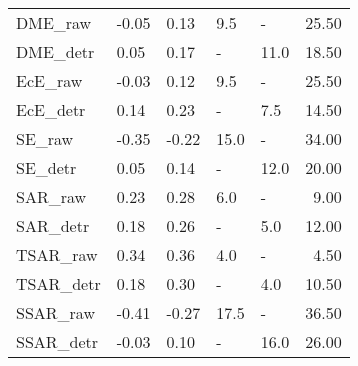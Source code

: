 \begin{tabular}{lllllr}
\midrule
DME\_raw & -0.05 & 0.13 & 9.5 & - & 25.50 \\
DME\_detr & 0.05 & 0.17 & - & 11.0 & 18.50 \\
\midrule
EcE\_raw & -0.03 & 0.12 & 9.5 & - & 25.50 \\
EcE\_detr & 0.14 & 0.23 & - & 7.5 & 14.50 \\
\midrule
SE\_raw & -0.35 & -0.22 & 15.0 & - & 34.00 \\
SE\_detr & 0.05 & 0.14 & - & 12.0 & 20.00 \\
\midrule
SAR\_raw & 0.23 & 0.28 & 6.0 & - & 9.00 \\
SAR\_detr & 0.18 & 0.26 & - & 5.0 & 12.00 \\
\midrule
TSAR\_raw & 0.34 & 0.36 & 4.0 & - & 4.50 \\
TSAR\_detr & 0.18 & 0.30 & - & 4.0 & 10.50 \\
\midrule
SSAR\_raw & -0.41 & -0.27 & 17.5 & - & 36.50 \\
SSAR\_detr & -0.03 & 0.10 & - & 16.0 & 26.00 \\
\midrule
\bottomrule
\end{tabular}
\midrule
